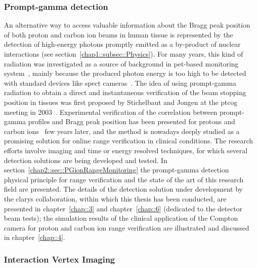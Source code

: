 \subsubsection{Prompt-gamma detection}\label{chap1::subsec::PGgeneral}
An alternative way to access valuable information about the Bragg peak position of both proton and carbon ion beams in human tissue is represented by the detection of high-energy photons promptly emitted as a by-product of nuclear interactions (see section~\ref{chap1::subsec::Physics}). For many years, this kind of radiation was investigated as a source of background in \gls{pet}-based monitoring system~\parencite{Parodi2005}, mainly because the produced photon energy is too high to be detected with standard devices like \gls{spect} cameras~\parencite{Kraan2015b}. The idea of using prompt-gamma radiation to obtain a direct and instantaneous verification of the beam stopping position in tissues was first proposed by Stichelbaut and Jongen at the  \gls{ptcog} meeting in 2003~\parencite{Stichelbaut2003}. Experimental verification of the correlation between prompt-gamma profiles and Bragg peak position has been presented for protons and carbon ions~\parencite{Min2006, Testa2008} few years later, and the method is nowadays deeply studied as a promising solution for online range verification in clinical conditions. The research efforts involve imaging and time or energy resolved techniques, for which several detection solutions are being developed and tested. 
In section~\ref{chap2::sec::PGionRangeMonitoring} the prompt-gamma detection physical principle for range verification and the state of the art of this research field are presented. The details of the detection solution under development by the \gls{clarys} collaboration, within which this thesis has been conducted, are presented in chapter~\ref{chap::3} and chapter~\ref{chap::6} (dedicated to the detector beam tests); the simulation results of the clinical application of the Compton camera for proton and carbon ion range verification are illustrated and discussed in chapter~\ref{chap::4}.   

\subsubsection{Interaction Vertex Imaging}\label{chap1::subsec::IVI}

